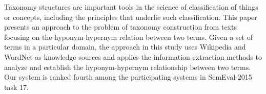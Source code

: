 Taxonomy structures are important tools in the science of classification of things or concepts, including the principles that underlie such classification. This paper presents an approach to the problem of taxonomy construction from texts focusing on the hyponym-hypernym relation between two terms. Given a set of terms in a particular domain, the approach in this study uses Wikipedia and WordNet as knowledge sources and applies the information extraction methods to analyze and establish the hyponym-hypernym relationship between two terms.  Our system is ranked fourth among the participating systems in SemEval-2015 task 17.
